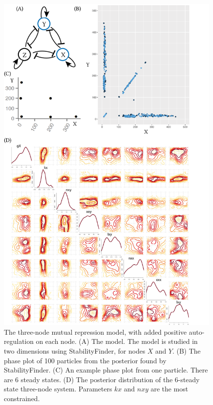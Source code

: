 \begin{figure}[h]
\begin{center}
\includegraphics[scale=0.6]{../../chapters/chapterStabilityFinder/images/lu_6ss_w.png}
\caption[The three-node mutual repression model, with added positive auto-regulation on each node.]{ \label{fig:fig8}The three-node mutual repression model, with added positive auto-regulation on each node. (A) The model. The model is studied in two dimensions using StabilityFinder, for nodes $X$ and $Y$. (B) The phase plot of 100 particles from the posterior found by StabilityFinder. (C) An example phase plot from one particle. There are 6 steady states. (D) The posterior distribution of the 6-steady state three-node system. Parameters $kx$ and $nxy$ are the most constrained.}
\end{center}
\end{figure}


